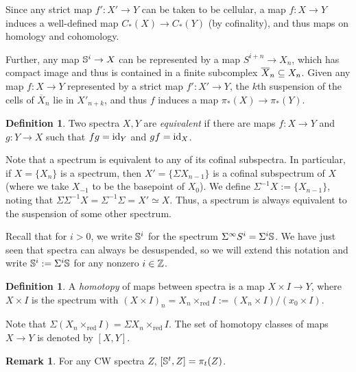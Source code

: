 \documentclass[11pt, titlepage]{article} %
\def\bb{\ensuremath\mathbb}
\def\subq{\ensuremath\subseteq}
\def\inte{\ensuremath\mathbb{Z}}
\def\id{\ensuremath\text{id}}
\numberwithin{equation}{subsection}
\theoremstyle{plain}
\theoremstyle{definition}
\newtheorem{definition}[theorem]{Definition}
\newtheorem{remark}[theorem]{Remark}
\begin{document}
Since any strict map \(f' : X' \to Y\) can be taken to be cellular, a map \(f : X \to Y\) induces a well-defined map \(C_*(X)\to C_*(Y)\) (by cofinality), and thus maps on homology and cohomology. 

Further, any map \(\bb{S}^i\to X\) can be represented by a map \(S^{i+n}\to X_n\), which has compact image and thus %
is contained in a finite subcomplex \(\overline X_n \subq X_n\). Given any map \(f : X \to Y\) represented by a strict map \(f' : X' \to Y\), the \(k\)th suspension of the cells of \(\overline X_n\) lie in \(X'_{n+k}\), and thus \(f\) induces a map \(\pi_*(X) \to \pi_*(Y)\). %

\begin{definition}
Two spectra \(X, Y\) are \textit{equivalent} if there are maps \(f : X \to Y\) and \(g : Y \to X\) such that \(fg=\id_{Y}\) and \(gf=\id_X\).
\end{definition}

Note that a spectrum is equivalent to any of its cofinal subspectra. In particular, if \(X=\{X_n\}\) is a spectrum, then \(X'=\{\Sigma X_{n-1}\}\) is a cofinal subspectrum of \(X\) (where we take \(X_{-1}\) to be the basepoint of \(X_0\)). We define \(\Sigma^{-1}X:=\{X_{n-1}\}\), noting that \(\Sigma \Sigma^{-1}X=\Sigma^{-1}\Sigma=X'\simeq X\). Thus, a spectrum is always equivalent to the suspension of some other spectrum.

Recall that for \(i>0\), we write \(\bb{S}^i\) for the spectrum \(\Sigma^\infty S^i=\Sigma^i \bb{S}\). We have just seen that spectra can always be desuspended, so we will extend this notation and write \(\bb{S}^i:=\Sigma^i \bb{S}\) for any nonzero \(i\in \inte\). 

\begin{definition}
A \textit{homotopy} of maps between spectra is a map \(X\times I \to Y\), where \(X\times I\) is the spectrum with \((X\times I)_n=X_n\times_{\text{red}} I:= (X_n\times I)/(x_0\times I)\).
\end{definition}

Note that \(\Sigma(X_n\times_{\text{red}}I)=\Sigma X_n\times_{\text{red}}I\). The set of homotopy classes of maps \(X\to Y\) is denoted by \([X,Y]\). 

\begin{remark}
For any CW spectra \(Z\), \([\bb{S}^t, Z]=\pi_t(Z)\). %
\end{remark}
\end{document}

